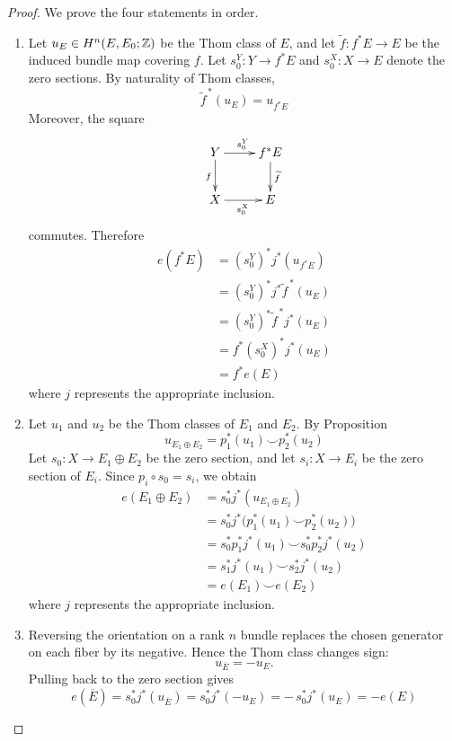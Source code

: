 \documentclass[12pt]{article}
\begin{document}
\begin{proof}
We prove the four statements in order.

\begin{enumerate}
    \item Let $u_E\in H^n(E,E_0;\mathbb Z)$ be the Thom class of $E$, and let $\widetilde f:f^*E\to E$ be the induced bundle map covering $f$. Let $s_0^Y:Y\to f^*E$ and $s_0^X:X\to E$ denote the zero sections. By naturality of Thom classes, 
    \[ \widetilde f^{\,*}(u_E)=u_{f^*E} \]
    Moreover, the square
    \[ 
        \xymatrix{ Y \ar[r]^{s_0^Y} \ar[d]_f & f^*E \ar[d]^{\widetilde f} \\
        X \ar[r]_{s_0^X} & E
        }     
    \]
    commutes. Therefore
    \begin{align*}
        e(f^*E)
        &= (s_0^Y)^*j^*(u_{f^*E}) \\
        &= (s_0^Y)^*j^*\widetilde f^{\,*}(u_E) \\
        &= (s_0^Y)^*\widetilde f^{\,*}j^*(u_E) \\
        &= f^*(s_0^X)^*j^*(u_E) \\
        &= f^*e(E)
    \end{align*}
    where $j$ represents the appropriate inclusion.

    \item Let $u_1$ and $u_2$ be the Thom classes of $E_1$ and $E_2$. By Proposition
    \[ u_{E_1\oplus E_2}=p_1^*(u_1)\smile p_2^*(u_2) \]
    Let $s_0:X\to E_1\oplus E_2$ be the zero section, and let $s_i:X\to E_i$ be the zero section of $E_i$. Since $p_i\circ s_0=s_i$, we obtain
    \begin{align*}
    e(E_1\oplus E_2)
    &= s_0^*j^*(u_{E_1\oplus E_2}) \\
    &= s_0^*j^*\bigl(p_1^*(u_1)\smile p_2^*(u_2)\bigr) \\
    &= s_0^*p_1^*j^*(u_1)\smile s_0^*p_2^*j^*(u_2) \\
    &= s_1^*j^*(u_1)\smile s_2^*j^*(u_2) \\
    &= e(E_1)\smile e(E_2)
    \end{align*}
    where $j$ represents the appropriate inclusion.

    \item Reversing the orientation on a rank $n$ bundle replaces the chosen generator on each fiber by its negative. Hence the Thom class changes sign:
    \[ u_{\overline E}=-u_E. \]
    Pulling back to the zero section gives
    \[ e(\overline E)=s_0^*j^*(u_{\overline E}) =s_0^*j^*(-u_E) =-\,s_0^*j^*(u_E) =-e(E)
    \]


\end{enumerate}
\end{proof}
\end{document}
